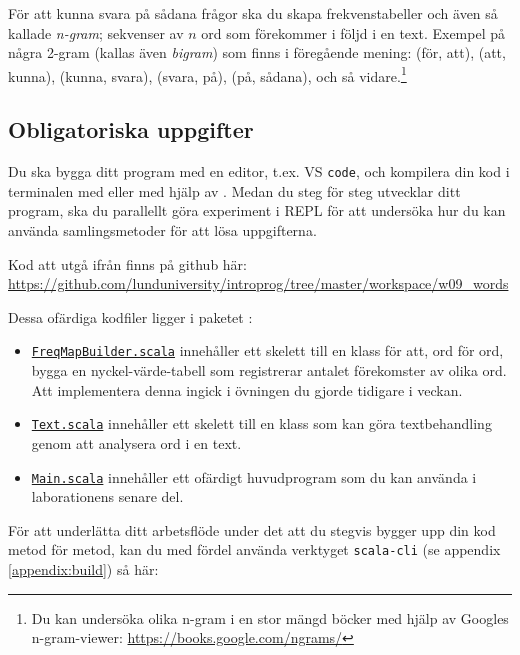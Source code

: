 \noindent För att kunna svara på sådana frågor ska du skapa frekvenstabeller och även så kallade \emph{n-gram}; sekvenser av $n$ ord som förekommer i följd i en text. Exempel på några 2-gram (kallas även \emph{bigram}) som finns i föregående mening: (för, att), (att, kunna), (kunna, svara), (svara, på), (på, sådana), och så vidare.\footnote{Du kan undersöka olika n-gram i en stor mängd böcker med hjälp av Googles n-gram-viewer: \url{https://books.google.com/ngrams/}}

\subsection{Obligatoriska uppgifter}

Du ska bygga ditt program med en editor, t.ex. VS \texttt{code}, och kompilera din kod i terminalen med  eller med hjälp av . Medan du steg för steg utvecklar ditt program, ska du parallellt göra experiment i REPL för att undersöka hur du kan använda samlingsmetoder för att lösa uppgifterna.

Kod att utgå ifrån finns på github här: \url{https://github.com/lunduniversity/introprog/tree/master/workspace/w09_words}

Dessa ofärdiga kodfiler ligger i paketet :
\begin{itemize}
  \item \href{https://github.com/lunduniversity/introprog/blob/master/workspace/w09_words/FreqMapBuilder.scala}{\texttt{FreqMapBuilder.scala}} innehåller ett skelett till en klass för att, ord för ord, bygga en nyckel-värde-tabell som registrerar antalet förekomster av olika ord. Att implementera denna ingick i övningen du gjorde tidigare i veckan.

  \item \href{https://github.com/lunduniversity/introprog/blob/master/workspace/w09_words/Text.scala}{\texttt{Text.scala}} innehåller ett skelett till en klass som kan göra textbehandling genom att analysera ord i en text.

  \item \href{https://github.com/lunduniversity/introprog/blob/master/workspace/w09_words/Main.scala}{\texttt{Main.scala}} innehåller ett ofärdigt huvudprogram som du kan använda i laborationens senare del.
\end{itemize}

För att underlätta ditt arbetsflöde under det att du stegvis bygger upp din kod metod för metod, kan du med fördel använda verktyget \texttt{scala-cli} (se appendix \ref{appendix:build}) så här:

